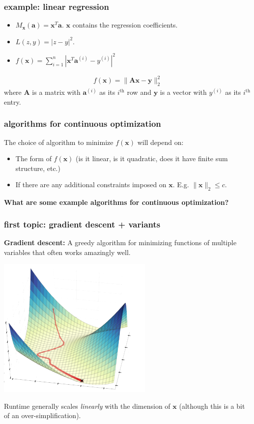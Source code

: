 \documentclass[compress]{beamer}
\newcommand{\bv}[1]{\mathbf{#1}}
\begin{document}
\begin{frame}
	\frametitle{example: linear regression}
	\begin{itemize}
		\item $M_{\bv{x}}(\bv{a}) = \bv{x}^T\bv{a}$. $\bv{x}$ contains the regression coefficients. 
		\item $L(z,y) = |z-y|^2$. 
		\item $f(\bv{x}) = \sum_{i=1}^n |\bv{x}^T\bv{a}^{(i)} - y^{(i)}|^2$
	\end{itemize}
	\begin{align*}
		f(\bv{x}) = \|\bv{A}\bv{x} - \bv{y}\|_2^2
	\end{align*}
	where $\bv{A}$ is a matrix with $\bv{a}^{(i)}$ as its $i^\text{th}$ row and $\bv{y}$ is a vector with $y^{(i)}$ as its $i^\text{th}$ entry. 
\end{frame}

\begin{frame}
	\frametitle{algorithms for continuous optimization}
	The choice of algorithm to minimize $f(\bv{x})$ will depend on:
	\begin{itemize}
		\item The form of $f(\bv{x})$ (is it linear, is it quadratic, does it have finite sum structure, etc.)
		\item If there are any additional constraints imposed on $\bv{x}$. E.g. $\|\bv{x}\|_2 \leq c$. 
	\end{itemize}
	\textbf{What are some example algorithms for continuous optimization?}
	
\end{frame}

\begin{frame}
	\frametitle{first topic: gradient descent + variants}
	\textbf{Gradient descent:} A greedy algorithm for minimizing functions of multiple variables that often works amazingly well. 
	\begin{center}
		\includegraphics[width=.4\textwidth]{greedy_gradient.png}
		
		Runtime generally scales \emph{linearly} with the dimension of $\bv{x}$ (although this is a bit of an over-simplification).
	\end{center}
\end{frame}
\end{document}
